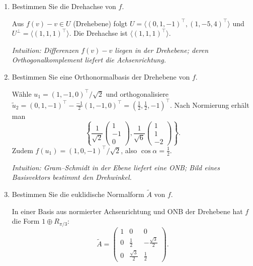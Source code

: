 \documentclass[11pt, a4paper]{article}
\begin{document}
\begin{enumerate}
  \item Bestimmen Sie die Drehachse von $f$.
  \begin{framed}
  Aus $f(v)-v\in U$ (Drehebene) folgt
  $U=\langle(0,1,-1)^\top,(1,-5,4)^\top\rangle$ und
  $U^\perp=\langle(1,1,1)^\top\rangle$. Die Drehachse ist $\langle(1,1,1)^\top\rangle$.

  \medskip\noindent\textit{Intuition: Differenzen $f(v)-v$ liegen in der Drehebene; deren Orthogonalkomplement liefert die Achsenrichtung.}
  \end{framed}
  \item Bestimmen Sie eine Orthonormalbasis der Drehebene von $f$.
  \begin{framed}
  Wähle $u_1=(1,-1,0)^\top/\sqrt2$ und orthogonalisiere
  $\tilde u_2=(0,1,-1)^\top-\tfrac{-1}{2}(1,-1,0)^\top=(\tfrac12,\tfrac12,-1)^\top$.
  Nach Normierung erhält man
  \[
  \left\{\frac{1}{\sqrt2}\!\begin{pmatrix}1\\-1\\0\end{pmatrix},
  \frac{1}{\sqrt6}\!\begin{pmatrix}1\\1\\-2\end{pmatrix}\right\}.
  \]
  Zudem $f(u_1)=(1,0,-1)^\top/\sqrt2$, also $\cos\alpha=\tfrac12$.

  \medskip\noindent\textit{Intuition: Gram–Schmidt in der Ebene liefert eine ONB; Bild eines Basisvektors bestimmt den Drehwinkel.}
  \end{framed}
  \item Bestimmen Sie die euklidische Normalform $\tilde A$ von $f$.
  \begin{framed}
  In einer Basis aus normierter Achsenrichtung und ONB der Drehebene hat $f$
  die Form $1\oplus R_{\pi/3}$:
  \[
  \tilde A=
  \begin{pmatrix}
  1&0&0\\[2pt]
  0&\tfrac12&-\tfrac{\sqrt3}{2}\\[2pt]
  0&\tfrac{\sqrt3}{2}&\tfrac12
  \end{pmatrix}.
  \]


\end{framed}
\end{enumerate}
\end{document}
